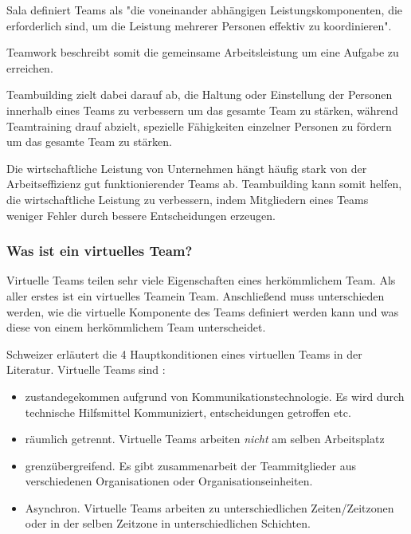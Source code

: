 \documentclass[a4paper,11pt]{article}%
\renewcommand{\\}{\vspace*{0.5\baselineskip} \newline}
\begin{document}
Sala \citep[p.541]{salas2008teams} definiert Teams als "die voneinander abhängigen Leistungskomponenten, die erforderlich sind, um die Leistung mehrerer Personen effektiv zu koordinieren".

Teamwork beschreibt somit die gemeinsame Arbeitsleistung um eine Aufgabe zu erreichen.

Teambuilding zielt dabei darauf ab, die Haltung oder Einstellung der Personen innerhalb eines Teams zu verbessern um das gesamte Team zu stärken, während Teamtraining drauf abzielt, spezielle Fähigkeiten einzelner Personen zu fördern um das gesamte Team zu stärken. \citep[p. 367-369]{shuffler2011there}\
		
	Die wirtschaftliche Leistung von Unternehmen hängt häufig stark von der Arbeitseffizienz gut funktionierender Teams ab. Teambuilding kann somit helfen, die wirtschaftliche Leistung zu verbessern, indem Mitgliedern eines Teams weniger Fehler durch bessere Entscheidungen erzeugen. \citep[p. 1-6]{biech2007pfeiffer} 

\subsubsection{Was ist ein virtuelles Team?}


Virtuelle Teams teilen sehr viele Eigenschaften eines herkömmlichem Team. Als aller erstes ist ein \dq virtuelles Team\dq ein \dq Team\dq. Anschließend muss unterschieden werden, wie die virtuelle Komponente des Teams definiert werden kann und was diese von einem herkömmlichem Team unterscheidet. 

Schweizer \citep[p.270]{schweitzer2010conceptualizing} erläutert die 4 Hauptkonditionen eines virtuellen Teams in der Literatur.
Virtuelle Teams sind :
\begin{itemize}
\item zustandegekommen aufgrund von Kommunikationstechnologie. Es wird durch technische Hilfsmittel Kommuniziert, entscheidungen getroffen etc.
\item räumlich getrennt. Virtuelle Teams arbeiten \textit{nicht} am selben Arbeitsplatz
\item grenzübergreifend. Es gibt zusammenarbeit der Teammitglieder aus verschiedenen Organisationen oder Organisationseinheiten.
\item Asynchron. Virtuelle Teams arbeiten zu unterschiedlichen Zeiten/Zeitzonen oder in der selben Zeitzone in unterschiedlichen Schichten.
\end{itemize}
\end{document}

